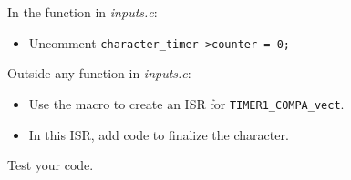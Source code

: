 In the  function in \textit{inputs.c}:
\begin{itemize}
    \item Uncomment \lstinline{character_timer->counter = 0;}
\end{itemize}

Outside any function in \textit{inputs.c}:
\begin{itemize}
    \item Use the  macro to create an ISR for \lstinline{TIMER1_COMPA_vect}.
    \item In this ISR, add code to finalize the character.
\end{itemize}

Test your code.
